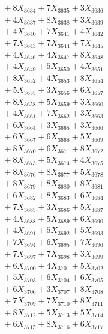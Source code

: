 \documentclass[a4paper,10pt]{article}
\begin{document}
{\begin{align}
&\;  + 8 X_{3634} + 7 X_{3635} + 3 X_{3636} \\[0.3ex]
&\;  + 4 X_{3637} + 8 X_{3638} + 3 X_{3639} \\[0.5ex]\allowbreak
&\;  + 4 X_{3640} + 7 X_{3641} + 4 X_{3642} \\[0.3ex]
&\;  + 7 X_{3643} + 7 X_{3644} + 7 X_{3645} \\[0.3ex]
&\;  + 4 X_{3646} + 4 X_{3647} + 8 X_{3648} \\[0.3ex]
&\;  + 4 X_{3649} + 5 X_{3650} + 4 X_{3651} \\[0.3ex]
&\;  + 8 X_{3652} + 4 X_{3653} + 8 X_{3654} \\[0.3ex]
&\;  + 5 X_{3655} + 3 X_{3656} + 6 X_{3657} \\[0.3ex]
&\;  + 8 X_{3658} + 5 X_{3659} + 3 X_{3660} \\[0.3ex]
&\;  + 4 X_{3661} + 7 X_{3662} + 3 X_{3663} \\[0.3ex]
&\;  + 6 X_{3664} + 3 X_{3665} + 3 X_{3666} \\[0.3ex]
&\;  + 6 X_{3667} + 6 X_{3668} + 5 X_{3669} \\[0.5ex]\allowbreak
&\;  + 8 X_{3670} + 6 X_{3671} + 8 X_{3672} \\[0.3ex]
&\;  + 8 X_{3673} + 5 X_{3674} + 4 X_{3675} \\[0.3ex]
&\;  + 8 X_{3676} + 8 X_{3677} + 5 X_{3678} \\[0.3ex]
&\;  + 8 X_{3679} + 8 X_{3680} + 8 X_{3681} \\[0.3ex]
&\;  + 6 X_{3682} + 8 X_{3683} + 6 X_{3684} \\[0.3ex]
&\;  + 7 X_{3685} + 3 X_{3686} + 5 X_{3687} \\[0.3ex]
&\;  + 4 X_{3688} + 5 X_{3689} + 6 X_{3690} \\[0.3ex]
&\;  + 4 X_{3691} + 5 X_{3692} + 5 X_{3693} \\[0.3ex]
&\;  + 7 X_{3694} + 6 X_{3695} + 7 X_{3696} \\[0.3ex]
&\;  + 7 X_{3697} + 7 X_{3698} + 3 X_{3699} \\[0.5ex]\allowbreak
&\;  + 6 X_{3700} + 4 X_{3701} + 5 X_{3702} \\[0.3ex]
&\;  + 5 X_{3703} + 6 X_{3704} + 6 X_{3705} \\[0.3ex]
&\;  + 6 X_{3706} + 3 X_{3707} + 8 X_{3708} \\[0.3ex]
&\;  + 7 X_{3709} + 7 X_{3710} + 8 X_{3711} \\[0.3ex]
&\;  + 8 X_{3712} + 5 X_{3713} + 5 X_{3714} \\[0.3ex]
&\;  + 6 X_{3715} + 8 X_{3716} + 6 X_{3717} \\[0.3ex]

\end{align}}
\end{document}
